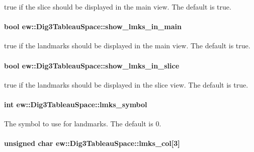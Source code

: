 \label{classew_1_1Dig3TableauSpace_a8c8a902e9e636bffc8638c8105b3b5b4}
{\ttfamily true} if the slice should be displayed in the main view. The default is {\ttfamily true}. \hypertarget{classew_1_1Dig3TableauSpace_a302c76a3185e05d1bc5b2954489004ec}{
\paragraph[{show\_\-lmks\_\-in\_\-main}]{\setlength{\rightskip}{0pt plus 5cm}bool {\bf ew::Dig3TableauSpace::show\_\-lmks\_\-in\_\-main}}\hfill}
\label{classew_1_1Dig3TableauSpace_a302c76a3185e05d1bc5b2954489004ec}
{\ttfamily true} if the landmarks should be displayed in the main view. The default is {\ttfamily true}. \hypertarget{classew_1_1Dig3TableauSpace_a20ff63b1ab1b18a7184db0e6850d6570}{
\paragraph[{show\_\-lmks\_\-in\_\-slice}]{\setlength{\rightskip}{0pt plus 5cm}bool {\bf ew::Dig3TableauSpace::show\_\-lmks\_\-in\_\-slice}}\hfill}
\label{classew_1_1Dig3TableauSpace_a20ff63b1ab1b18a7184db0e6850d6570}
{\ttfamily true} if the landmarks should be displayed in the slice view. The default is {\ttfamily true}. \hypertarget{classew_1_1Dig3TableauSpace_ac5de6ceab785dc79b0b681757d33dc88}{
\paragraph[{lmks\_\-symbol}]{\setlength{\rightskip}{0pt plus 5cm}int {\bf ew::Dig3TableauSpace::lmks\_\-symbol}}\hfill}
\label{classew_1_1Dig3TableauSpace_ac5de6ceab785dc79b0b681757d33dc88}
The symbol to use for landmarks. The default is 0. \hypertarget{classew_1_1Dig3TableauSpace_aaa01d6e4fc38104bd38fa7dbd01d4acc}{
\paragraph[{lmks\_\-col}]{\setlength{\rightskip}{0pt plus 5cm}unsigned char {\bf ew::Dig3TableauSpace::lmks\_\-col}\mbox{[}3\mbox{]}}\hfill}
